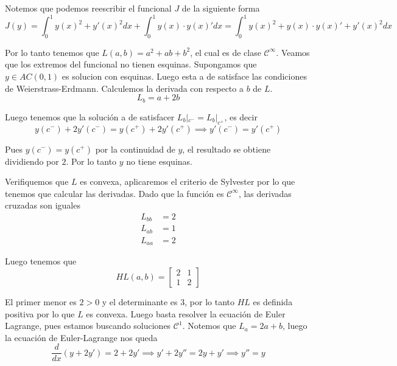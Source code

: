 \documentclass[a4paper,oneside,10.5pt]{USMArt}
\begin{document}
\begin{sol}
  Notemos que podemos reescribir el funcional $J$ de la siguiente forma
  \begin{equation*}
    J(y) = \int_{0}^{1} y(x)^{2} + y'(x)^{2} dx + \int_{0}^{1} y(x) \cdot y(x)' dx = \int_{0}^{1} y(x)^{2} + y(x) \cdot y(x)' + y'(x)^{2} dx
  \end{equation*}

  Por lo tanto tenemos que $L(a, b) = a^{2} + ab + b^{2}$, el cual es de clase $\mathcal{C}^{\infty}$. Veamos que los
  extremos del funcional no tienen esquinas. Supongamos que $y \in AC(0,1)$ es solucion con esquinas.
  Luego esta a de satisface las condiciones de Weierstrass-Erdmann. Calculemos la derivada con respecto a $b$ de $L$.
  \begin{equation*}
    L_{b} = a + 2b
  \end{equation*}


  Luego tenemos que la solución a de satisfacer $L_{b}|_{c^{-}} = L_{b}|_{c^{+}}$, es decir
  \begin{equation*}
    y(c^{-}) + 2y'(c^{-}) = y(c^{+}) + 2y'(c^{+}) \implies y'(c^{-}) = y'(c^{+})
  \end{equation*}

  Pues $y(c^{-}) = y(c^{+})$ por la continuidad de $y$, el resultado se obtiene dividiendo por $2$. Por lo tanto
  $y$ no tiene esquinas.

  Verifiquemos que $L$ es convexa, aplicaremos el criterio de Sylvester por lo que tenemos que calcular las derivadas.
  Dado que la función es $\mathcal{C}^{\infty}$, las derivadas cruzadas son iguales
  \begin{align*}
    L_{bb} &= 2\\
    L_{ab} &= 1\\
    L_{aa} &= 2
  \end{align*}

  Luego tenemos que
  \begin{equation*}
    HL(a, b) = \begin{bmatrix} 2 & 1\\ 1 & 2 \end{bmatrix}
  \end{equation*}

  El primer menor es $2 > 0$ y el determinante es $3$, por lo tanto $HL$ es definida positiva por lo que $L$ es convexa.
  Luego basta resolver la ecuación de Euler Lagrange, pues estamos buscando soluciones $\mathcal{C}^{1}$. Notemos que $L_{a} = 2a + b$, luego la ecuación de Euler-Lagrange
  nos queda
  \begin{equation*}
    \frac{d}{dx}(y + 2y') = 2 + 2y' \implies y' + 2y'' = 2y + y' \implies y'' = y
  \end{equation*}


\end{sol}
\end{document}
